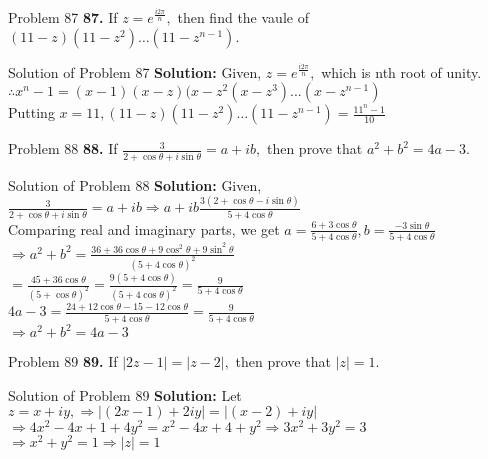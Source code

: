 \documentclass[aspectratio=169,8pt]{beamer}
\begin{document}
\begin{frame}{Problem 87}
  \textbf{87.} If $z = e^{\frac{i2\pi}{n}},$ then find the vaule of $(11 - z)(11 - z^2)\ldots(11 - z^{n - 1}).$
\end{frame}
\begin{frame}{Solution of Problem 87}
  \textbf{Solution:} Given, $z = e^{\frac{i2\pi}{n}},$ which is nth root of unity.\\
  \vspace*{0.2cm}
  $\therefore x^n - 1 = (x - 1)(x - z)(x - z^2 (x - z^3) ... (x - z^{n - 1})$\\
  \vspace*{0.2cm}
  Putting $x = 11, (11 - z)(11 - z^2)\ldots(11 - z^{n - 1}) = \frac{11^n - 1}{10}$
\end{frame}
\begin{frame}{Problem 88}
  \textbf{88.} If $\frac{3}{2 + \cos\theta + i\sin\theta} = a + ib,$ then prove that $a^2 + b^2 = 4a - 3.$
\end{frame}
\begin{frame}{Solution of Problem 88}
  \textbf{Solution:} Given, $\frac{3}{2 + \cos\theta + i\sin\theta} = a + ib \Rightarrow a + ib  \frac{3(2 + \cos\theta - i\sin\theta)}{5 + 4\cos\theta}$\\
  \vspace*{0.2cm}
  Comparing real and imaginary parts, we get
  $a = \frac{6 + 3\cos\theta}{5 + 4\cos\theta}, b = \frac{-3\sin\theta}{5 + 4\cos\theta}$\\
  \vspace*{0.2cm}
  $\Rightarrow a^2 + b^2 = \frac{36 + 36\cos\theta + 9\cos^2\theta + 9\sin^2\theta}{(5 + 4\cos\theta)^2}$\\
  \vspace*{0.2cm}
  $= \frac{45 + 36\cos\theta}{(5 + \cos\theta)^2} = \frac{9(5 + 4\cos\theta)}{(5 + 4\cos\theta)^2} = \frac{9}{5 + 4\cos\theta}$\\
  \vspace*{0.2cm}
  $4a - 3 = \frac{24 + 12\cos\theta - 15 - 12\cos\theta}{5 + 4\cos\theta} = \frac{9}{5 + 4\cos\theta}$\\
  \vspace*{0.2cm}
  $\Rightarrow a^2 + b^2 = 4a - 3$
\end{frame}
\begin{frame}{Problem 89}
  \textbf{89.} If $|2z - 1| = |z - 2|,$ then prove that $|z| = 1.$
\end{frame}
\begin{frame}{Solution of Problem 89}
  \textbf{Solution:} Let $z = x + iy, \Rightarrow |(2x - 1) + 2iy| = |(x - 2) + iy|$\\
  \vspace*{0.2cm}
  $\Rightarrow 4x^2 - 4x + 1 + 4y^2 = x^2 - 4x + 4 + y^2 \Rightarrow 3x^2 + 3y^2 = 3$\\
  \vspace*{0.2cm}
  $\Rightarrow x^2 + y^2 = 1\Rightarrow |z| = 1$
\end{frame}
\end{document}
